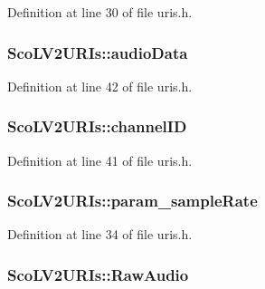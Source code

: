 Definition at line 30 of file uris.\+h.

\subsubsection[{\texorpdfstring{audio\+Data}{audioData}}]{ Sco\+L\+V2\+U\+R\+Is\+::audio\+Data}\hypertarget{struct_sco_l_v2_u_r_is_aec22f4691d90b0f0ed9f21c98db51bd2}{}\label{struct_sco_l_v2_u_r_is_aec22f4691d90b0f0ed9f21c98db51bd2}


Definition at line 42 of file uris.\+h.

\subsubsection[{\texorpdfstring{channel\+ID}{channelID}}]{ Sco\+L\+V2\+U\+R\+Is\+::channel\+ID}\hypertarget{struct_sco_l_v2_u_r_is_a8fdb5e6fa5d15656a600f0fff8e2210c}{}\label{struct_sco_l_v2_u_r_is_a8fdb5e6fa5d15656a600f0fff8e2210c}


Definition at line 41 of file uris.\+h.

\subsubsection[{\texorpdfstring{param\+\_\+sample\+Rate}{param_sampleRate}}]{ Sco\+L\+V2\+U\+R\+Is\+::param\+\_\+sample\+Rate}\hypertarget{struct_sco_l_v2_u_r_is_ad0afcbe26a6aa7d624a154ae8d69185f}{}\label{struct_sco_l_v2_u_r_is_ad0afcbe26a6aa7d624a154ae8d69185f}


Definition at line 34 of file uris.\+h.

\subsubsection[{\texorpdfstring{Raw\+Audio}{RawAudio}}]{ Sco\+L\+V2\+U\+R\+Is\+::\+Raw\+Audio}\hypertarget{struct_sco_l_v2_u_r_is_a0e65908eca6f7180605f1c08b9d454f2}{}\label{struct_sco_l_v2_u_r_is_a0e65908eca6f7180605f1c08b9d454f2}



